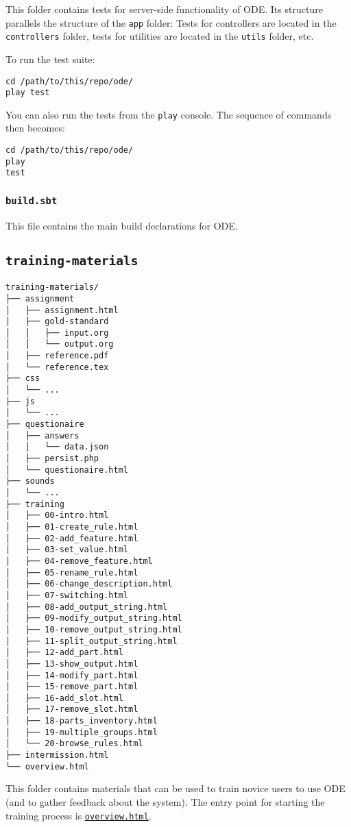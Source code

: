 \documentclass[11pt]{article}
\begin{document}
This folder contains tests for server-side functionality of ODE.
Its structure parallels the structure of the \texttt{app} folder: Tests
for controllers are located in the \texttt{controllers} folder, tests for
utilities are located in the \texttt{utils} folder, etc.

To run the test suite:

\begin{verbatim}
cd /path/to/this/repo/ode/
play test
\end{verbatim}

You can also run the tests from the \texttt{play} console. The sequence
of commands then becomes:

\begin{verbatim}
cd /path/to/this/repo/ode/
play
test
\end{verbatim}

\subsubsection{\texttt{build.sbt}}
\label{sec-3-3-7}
This file contains the main build declarations for ODE.

\subsection{\texttt{training-materials}}
\label{sec-3-4}
\begin{verbatim}
training-materials/
├── assignment
│   ├── assignment.html
│   ├── gold-standard
│   │   ├── input.org
│   │   └── output.org
│   ├── reference.pdf
│   └── reference.tex
├── css
│   └── ...
├── js
│   └── ...
├── questionaire
│   ├── answers
│   │   └── data.json
│   ├── persist.php
│   └── questionaire.html
├── sounds
│   └── ...
├── training
│   ├── 00-intro.html
│   ├── 01-create_rule.html
│   ├── 02-add_feature.html
│   ├── 03-set_value.html
│   ├── 04-remove_feature.html
│   ├── 05-rename_rule.html
│   ├── 06-change_description.html
│   ├── 07-switching.html
│   ├── 08-add_output_string.html
│   ├── 09-modify_output_string.html
│   ├── 10-remove_output_string.html
│   ├── 11-split_output_string.html
│   ├── 12-add_part.html
│   ├── 13-show_output.html
│   ├── 14-modify_part.html
│   ├── 15-remove_part.html
│   ├── 16-add_slot.html
│   ├── 17-remove_slot.html
│   ├── 18-parts_inventory.html
│   ├── 19-multiple_groups.html
│   └── 20-browse_rules.html
├── intermission.html
└── overview.html
\end{verbatim}

This folder contains materials that can be used to train novice
users to use ODE (and to gather feedback about the system). The
entry point for starting the training process is \href{training-materials/overview.html}{\texttt{overview.html}}.
\end{document}
